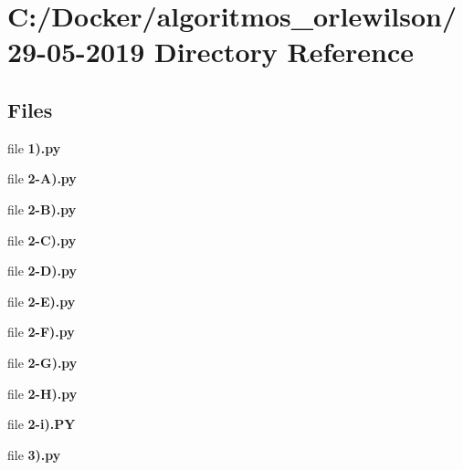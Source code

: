 \section{C\+:/\+Docker/algoritmos\+\_\+orlewilson/29-\/05-\/2019 Directory Reference}
\label{dir_259dcdb42c19a9ad22b458f249f3f030}
\subsection*{Files}
\begin{DoxyCompactItemize}
\item 
file \textbf{ 1).\+py}
\item 
file \textbf{ 2-\/\+A).\+py}
\item 
file \textbf{ 2-\/\+B).\+py}
\item 
file \textbf{ 2-\/\+C).\+py}
\item 
file \textbf{ 2-\/\+D).\+py}
\item 
file \textbf{ 2-\/\+E).\+py}
\item 
file \textbf{ 2-\/\+F).\+py}
\item 
file \textbf{ 2-\/\+G).\+py}
\item 
file \textbf{ 2-\/\+H).\+py}
\item 
file \textbf{ 2-\/i).\+PY}
\item 
file \textbf{ 3).\+py}
\end{DoxyCompactItemize}
